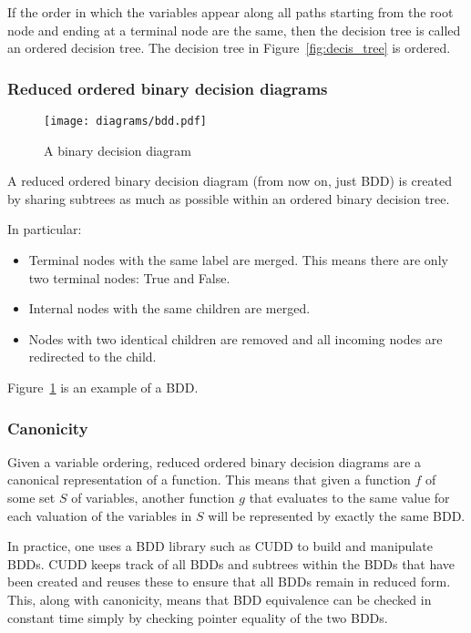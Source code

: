 If the order in which the variables appear along all paths starting from the root node and ending at a terminal node are the same, then the decision tree is called an ordered decision tree. The decision tree in Figure~\ref{fig:decis_tree} is ordered.

\subsubsection{Reduced ordered binary decision diagrams}

\begin{figure}[t]
\centering
\texttt{[image: diagrams/bdd.pdf]}
\caption{A binary decision diagram}
\label{fig:bdd}
\end{figure}

A reduced ordered binary decision diagram (from now on, just BDD) is created by sharing subtrees as much as possible within an ordered binary decision tree.

In particular: 
\begin{itemize}
    \item Terminal nodes with the same label are merged. This means there are only two terminal nodes: True and False.
    \item Internal nodes with the same children are merged.
    \item Nodes with two identical children are removed and all incoming nodes are redirected to the child.
\end{itemize}

Figure~\ref{fig:bdd} is an example of a BDD.

\subsubsection{Canonicity}
Given a variable ordering, reduced ordered binary decision diagrams are a canonical representation of a function. This means that given a function $f$ of some set $S$ of variables, another function $g$ that evaluates to the same value for each valuation of the variables in $S$ will be represented by exactly the same BDD.

In practice, one uses a BDD library such as CUDD \cite{cudd} to build and manipulate BDDs. CUDD keeps track of all BDDs and subtrees within the BDDs that have been created and reuses these to ensure that all BDDs remain in reduced form. This, along with canonicity, means that BDD equivalence can be checked in constant time simply by checking pointer equality of the two BDDs.

